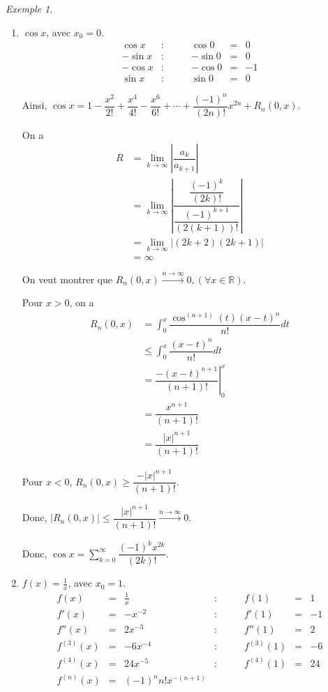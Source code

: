 \documentclass{report}
\newcommand*{\dsum}[4]{\displaystyle\sum_{#1=#2}^{#3}#4}
\newcommand*{\dlim}[3]{\displaystyle\lim_{#1 \to #2}#3}
\newcommand*{\dint}[3]{\displaystyle\int_{#1}^{#2}#3}
\newcommand*{\abs}[1]{\left| #1 \right|}
\newcommand*{\lte}{\leqslant}
\newcommand*{\gte}{\geqslant}
\newcommand*{\reels}{\mathbb{R}}
\theoremstyle{definition}
\theoremstyle{remark}
\newtheorem*{exem}{Exemple}
\begin{document}
	\begin{exem}~

		\begin{enumerate}[label=\alph*)]
			\item $\cos x$, avec $x_0=0$.
			\[
			\begin{array}{rlrcl}
				\cos x&:\qquad&\cos0&=&0\\
				-\sin x&:&-\sin0&=&0\\
				-\cos x&:&-\cos0&=&-1\\
				\sin x&:&\sin0&=&0
			\end{array}
			\]

			Ainsi, $\cos x = 1 - \dfrac{x^2}{2!} + \dfrac{x^4}{4!} - \dfrac{x^6}{6!} + \dotsb + \dfrac{(-1)^n}{(2n)!}x^{2n} + R_n(0, x)$.

			On a
			\begin{align*}
				R&= \dlim{k}{\infty}{\abs{\dfrac{a_k}{a_{k+1}}}}\\
				&= \dlim{k}{\infty}{\abs{\dfrac{\dfrac{(-1)^k}{(2k)!}}{\dfrac{(-1)^{k+1}}{(2(k+1))!}}}}\\
				&= \dlim{k}{\infty}{\abs{(2k+2)(2k+1)}}\\
				&= \infty
			\end{align*}

			On veut montrer que $R_n(0, x) \xrightarrow{n \to \infty} 0, (\forall x \in \reels)$.

			Pour $x>0$, on a
			\begin{align*}
				R_n(0, x)&= \dint{0}{x}{\dfrac{\cos^{(n+1)}(t) (x-t)^n}{n!} dt}\\
				&\lte \dint{0}{x}{\dfrac{(x-t)^n}{n!} dt}\\
				&= \left. \dfrac{-(x-t)^{n+1}}{(n+1)!} \right|_0^x\\
				&= \dfrac{x^{n+1}}{(n+1)!}\\
				&= \dfrac{\abs{x}^{n+1}}{(n+1)!}
			\end{align*}

			Pour $x<0$, $R_n(0, x) \gte \dfrac{-\abs{x}^{n+1}}{(n+1)!}$.

			Donc, $\abs{R_n(0, x)} \lte \dfrac{\abs{x}^{n+1}}{(n+1)!} \xrightarrow{n \to \infty} 0$.

			Donc, $\cos x = \dsum{k}{0}{\infty}{\dfrac{(-1)^kx^{2k}}{(2k)!}}$.
			\item $f(x)=\frac{1}{x}$, avec $x_0=1$.
			\[
			\begin{array}{rcllrcl}
				f(x)&=&\frac{1}{x}&:\qquad&f(1)&=&1\\
				f'(x)&=&-x^{-2}&:&f'(1)&=&-1\\
				f''(x)&=&2x^{-3}&:&f''(1)&=&2\\
				f^{(3)}(x)&=&-6x^{-4}&:&f^{(3)}(1)&=&-6\\
				f^{(4)}(x)&=&24x^{-5}&:&f^{(4)}(1)&=&24\\
				f^{(n)}(x)&=&(-1)^nn!x^{-(n+1)}
			\end{array}
			\]


\end{enumerate}
\end{exem}
\end{document}
